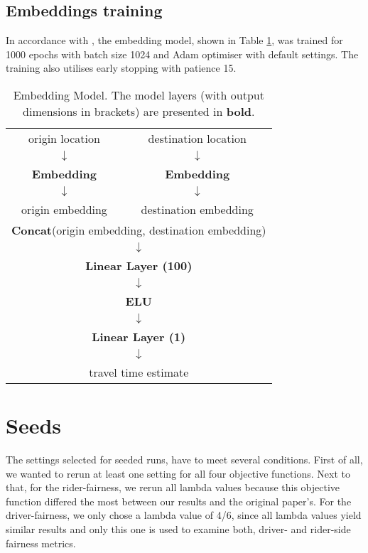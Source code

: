 \newpage
\subsection{Embeddings training} \label{sec:Embeddings_training}
In accordance with \citet{shah20}, the embedding model, shown in Table \ref{tab:emb}, was trained for 1000 epochs with batch size 1024 and Adam optimiser with default settings. The training also utilises early stopping with patience 15.

\begin{table}[!htbp]
    \centering
    \begin{tabular} { |c | c | }
    \hline
    origin location & destination location \\
    $\downarrow$ &  $\downarrow$ \\
    \textbf{Embedding} & \textbf{Embedding} \\
    $\downarrow$ &  $\downarrow$  \\
    origin embedding & destination embedding \\
    \hline
    \multicolumn{2}{|c|}{\textbf{Concat}(origin embedding, destination embedding)}  \\
    \multicolumn{2}{|c|}{$\downarrow$}  \\
    \multicolumn{2}{|c|}{\textbf{Linear Layer (100)}} \\
    \multicolumn{2}{|c|}{$\downarrow$}  \\
    \multicolumn{2}{|c|}{\textbf{ELU}} \\
    \multicolumn{2}{|c|}{$\downarrow$} \\
    \multicolumn{2}{|c|}{\textbf{Linear Layer (1)}} \\
    \multicolumn{2}{|c|}{$\downarrow$} \\
    \multicolumn{2}{|c|}{travel time estimate} \\
    
    \hline
    
\end{tabular}

\caption{Embedding Model. The model layers (with output dimensions in brackets) are presented in \textbf{bold}. }
\label{tab:emb}

\end{table}

\section{Seeds}\label{sec:Seeds}
The settings selected for seeded runs, have to meet several conditions. First of all, we wanted to rerun at least one setting for all four objective functions. Next to that, for the rider-fairness, we rerun all lambda values because this objective function differed the most between our results and the original paper's. For the driver-fairness, we only chose a lambda value of 4/6, since all lambda values yield similar results and only this one is used to examine both, driver- and rider-side fairness metrics.

